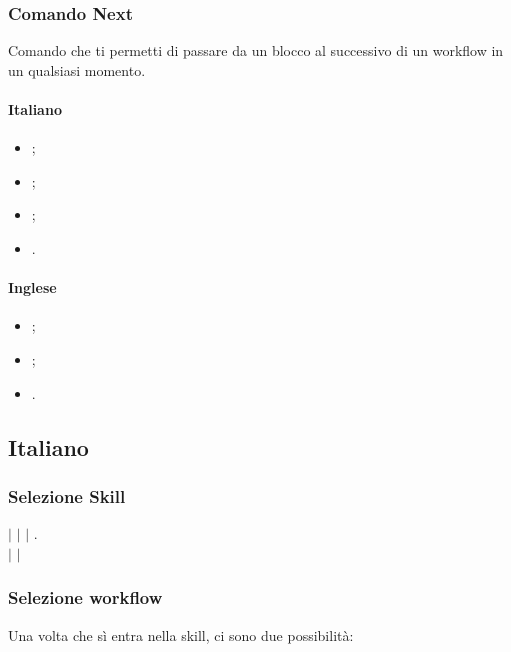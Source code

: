 \subsubsection{Comando Next}
Comando che ti permetti di passare da un blocco al successivo di un workflow in un qualsiasi momento.
\paragraph{Italiano}
\begin{itemize}
        \item {};
        \item {};
        \item {};
        \item {}.
\end{itemize}

\paragraph{Inglese}
\begin{itemize}
        \item {};
        \item {};
        \item {}.
\end{itemize}

\subsection{Italiano}

\subsubsection{Selezione Skill}

\utente {} $|$  $|$  $|$ .\\
\alexa  {} $|$  $|$ 

\subsubsection{Selezione workflow}
Una volta che sì entra nella skill, ci sono due possibilità:

